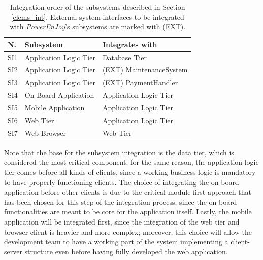 \begin{table}[H]
\begin{center}
\begin{tabular}{p{} | p{} | p{}}
\hline
\textbf{N.} & \textbf{Subsystem} & \textbf{Integrates with} \\
\hline
SI1 & Application Logic Tier & Database Tier \\
\hline
SI2 & Application Logic Tier & (EXT) MaintenanceSystem \\
\hline
SI3 & Application Logic Tier & (EXT) PaymentHandler \\
\hline
SI4 & On-Board Application & Application Logic Tier \\
\hline
SI5 & Mobile Application & Application Logic Tier \\
\hline
SI6 & Web Tier & Application Logic Tier \\
\hline
SI7 & Web Browser & Web Tier \\
\hline
\end{tabular}
\end{center}
\caption{Integration order of the subsystems described in Section \ref{elems_int}. External system interfaces to be integrated with \textit{PowerEnJoy}'s subsystems are marked with (EXT).}
\label{subsys_int}
\end{table}

Note that the base for the subsystem integration is the data tier, which is considered the most critical component; for the same reason, the application logic tier comes before all kinds of clients, since a working business logic is mandatory to have properly functioning clients. The choice of integrating the on-board application before other clients is due to the critical-module-first approach that has been chosen for this step of the integration process, since the on-board functionalities are meant to be core for the application itself. Lastly, the mobile application will be integrated first, since the integration of the web tier and browser client is heavier and more complex; moreover, this choice will allow the development team to have a working part of the system implementing a client-server structure even before having fully developed the web application.

